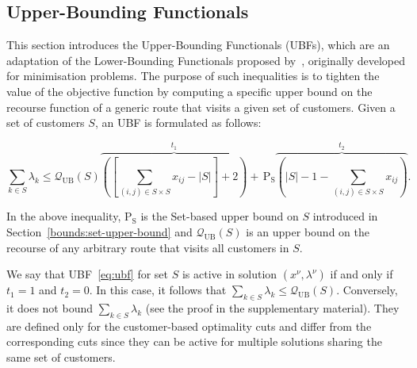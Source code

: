 \documentclass[11pt]{article}
\theoremstyle{definition}
\begin{document}
\subsection{Upper-Bounding Functionals}
\label{ssec:ubf}

This section introduces the Upper-Bounding Functionals (UBFs), which are an adaptation of the Lower-Bounding Functionals proposed by~\cite{Lucas2024}, originally developed for minimisation problems. The purpose of such inequalities is to tighten the value of the objective function by computing a specific upper bound on the recourse function of a generic route that visits a given set of customers.
%
Given a set of customers $S$, an UBF is formulated as follows:

\begin{equation}
	\label{eq:ubf}
	\sum_{k \in S} \lambda_k \leq \mathcal{Q}_{\text{UB}}(S) \overbrace{\left(\left [ \sum_{(i,j) \in S \times S} x_{ij} - |S| \right ] + 2 \right)}^{t_1} + \, \text{P}_{\text{S}} \overbrace{\left(|S| - 1 - \sum_{(i,j) \in S \times S} x_{ij}\right)}^{t_2}.
\end{equation}

In the above inequality, $\text{P}_{\text{S}}$ is the Set-based upper bound on $S$ introduced in Section~\ref{bounds:set-upper-bound} and $\mathcal{Q}_{\text{UB}}(S)$ is an upper bound on the recourse of any arbitrary route that visits all customers in $S$.

We say that UBF~\eqref{eq:ubf} for set $S$ is active in solution $(x^{\nu}, \lambda^{\nu})$ if and only if $t_1 = 1$ and $t_2 = 0$. In this case, it follows that $\sum_{k \in S} \lambda_k \leq \mathcal{Q}_{\text{UB}}(S)$.
Conversely, it does not bound $\sum_{k \in S} \lambda_k$ (see the proof in the supplementary material). They are defined only for the customer-based optimality cuts and differ from the corresponding cuts since they can be active for multiple solutions sharing the same set of customers.
\end{document}
